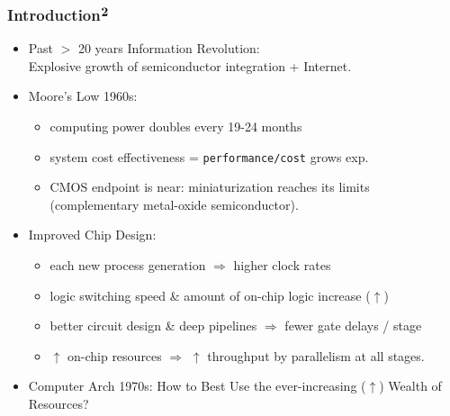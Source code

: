 \documentclass{beamer}
\renewcommand{\emph}[1]{\textcolor{structure}{#1}}
\newcommand{\emp}[1]{\textcolor{DikuRed}{ #1}}
\begin{document}
\begin{frame}[fragile,t]
\frametitle{Introduction$^{\mbox{\bf 2}}$}

\begin{itemize}
    \item Past $>$ 20 years \emph{Information Revolution}:\\
        Explosive growth of semiconductor integration + Internet.\bigskip

    \item Moore's Low 1960s: 
    \begin{itemize}
        \item computing power doubles every 19-24 months 
        \item \emph{system cost effectiveness = {\tt performance/cost} 
                grows exp}.
        \item \alert{CMOS endpoint is near}: miniaturization reaches its limits
                (complementary metal-oxide semiconductor).
    \end  {itemize}\bigskip

    \item Improved Chip Design:
    \begin{itemize}
        \item each new process generation $\Rightarrow$ higher clock rates 
        \item logic switching speed \& amount of on-chip logic increase ($\uparrow$)
        \item better circuit design \& deep pipelines $\Rightarrow$ 
                fewer gate delays / stage
        \item $\uparrow$ on-chip resources $\Rightarrow$ $\uparrow$ throughput by 
                parallelism at all stages. 
    \end  {itemize}\bigskip

    \item \emp{Computer Arch 1970s: How to Best Use the ever-increasing ($\uparrow$) 
            Wealth of Resources?}

\end{itemize}

\end{frame}
\end{document}
